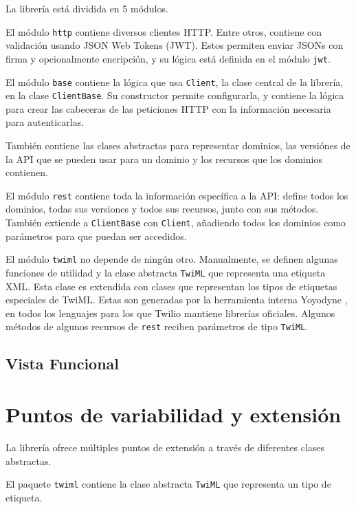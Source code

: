 \documentclass{article}
\begin{document}
La librería está dividida en 5 módulos.

\hfill

El módulo \verb|http| contiene diversos clientes HTTP.
Entre otros, contiene con validación usando JSON Web Tokens (JWT).
Estos permiten enviar JSONs con firma y opcionalmente encripción,
y su lógica está definida en el módulo \verb|jwt|.

\hfill

El módulo \verb|base| contiene
la lógica que usa \verb|Client|,
la clase central de la librería,
en la clase \verb|ClientBase|.
Su constructor permite configurarla,
y contiene la lógica para 
crear las cabeceras de las peticiones HTTP
con la información necesaria para autenticarlas.

También contiene las clases abstractas
para representar dominios,
las versiónes de la API que se pueden usar para un dominio
y los recursos que los dominios contienen.

\hfill

El módulo \verb|rest|
contiene toda la información específica a la API:
define todos los dominios,
todas sus versiones y todos sus recursos,
junto con sus métodos.
También extiende a \verb|ClientBase| con \verb|Client|,
añadiendo todos los dominios como parámetros
para que puedan ser accedidos.

\hfill

El módulo \verb|twiml| no depende de ningún otro.
Manualmente, se definen algunas funciones de utilidad
y la clase abstracta \verb|TwiML|
que representa una etiqueta XML.
Esta clase es extendida
con clases que representan los tipos de etiquetas especiales de TwiML.
Estas son generadas por la herramienta interna Yoyodyne
\cite{twilio-generated-yoyodyne},
en todos los lenguajes para los que Twilio mantiene librerías oficiales.
Algunos métodos de algunos recursos de \verb|rest|
reciben parámetros de tipo \verb|TwiML|.


\subsection{Vista Funcional}


\section{Puntos de variabilidad y extensión}

La librería ofrece múltiples puntos de extensión
a través de diferentes clases abstractas.

El paquete \verb|twiml| contiene la clase abstracta \verb|TwiML|
que representa un tipo de etiqueta.
\end{document}
